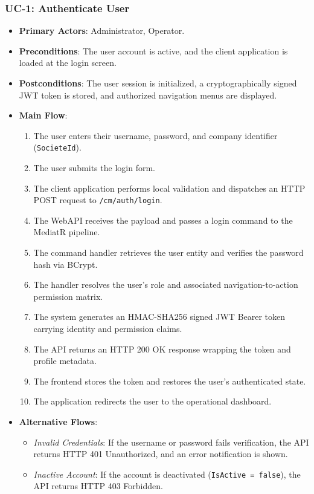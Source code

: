 \subsubsection{UC-1: Authenticate User}
\begin{itemize}
  \item \textbf{Primary Actors}: Administrator, Operator.
  \item \textbf{Preconditions}: The user account is active, and the client application is loaded at the login screen.
  \item \textbf{Postconditions}: The user session is initialized, a cryptographically signed JWT token is stored, and authorized navigation menus are displayed.
  \item \textbf{Main Flow}:
  \begin{enumerate}
    \item The user enters their username, password, and company identifier (\texttt{SocieteId}).
    \item The user submits the login form.
    \item The client application performs local validation and dispatches an HTTP POST request to \texttt{/cm/auth/login}.
    \item The WebAPI receives the payload and passes a login command to the MediatR pipeline.
    \item The command handler retrieves the user entity and verifies the password hash via BCrypt.
    \item The handler resolves the user's role and associated navigation-to-action permission matrix.
    \item The system generates an HMAC-SHA256 signed JWT Bearer token carrying identity and permission claims.
    \item The API returns an HTTP 200 OK response wrapping the token and profile metadata.
    \item The frontend stores the token and restores the user's authenticated state.
    \item The application redirects the user to the operational dashboard.
  \end{enumerate}
  \item \textbf{Alternative Flows}:
  \begin{itemize}
    \item \emph{Invalid Credentials}: If the username or password fails verification, the API returns HTTP 401 Unauthorized, and an error notification is shown.
    \item \emph{Inactive Account}: If the account is deactivated (\texttt{IsActive = false}), the API returns HTTP 403 Forbidden.
  \end{itemize}
\end{itemize}

